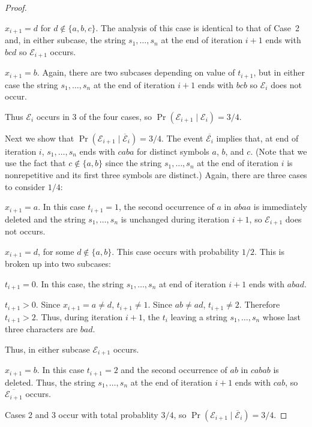 \documentclass{patmorin}
\begin{document}
\begin{proof}
\begin{compactenum}
    \item $x_{i+1}=d$ for $d\not\in\{a,b,c\}$.  The analysis of this case is identical to that of Case~2 and, in either subcase, the string $s_1,\ldots,s_n$ at the end of iteration $i+1$ ends with $bcd$ so $\mathcal{E}_{i+1}$ occurs.
    
    \item $x_{i+1}=b$.  Again, there are two subcases depending on value of $t_{i+1}$, but in either case the string $s_1,\ldots,s_n$ at the end of iteration $i+1$ ends with $bcb$ so $\mathcal{E}_i$ does not occur.
  \end{compactenum}
  Thus $\mathcal{E}_i$ occurs in 3 of the four cases, so $\Pr(\mathcal{E}_{i+1}\mid \mathcal{E}_{i})=3/4$.
  
  Next we show that $\Pr(\mathcal{E}_{i+1}\mid \overline{\mathcal{E}}_{i})=3/4$.
  The event $\overline{\mathcal{E}_i}$ implies that, at end of iteration $i$, $s_1,\ldots,s_n$ ends with $caba$ for distinct symbols $a$, $b$, and $c$.  (Note that we use the fact that $c\not\in\{a,b\}$ since the string $s_1,\ldots,s_n$ at the end of iteration $i$ is nonrepetitive and its first three symbols are distinct.)  Again, there are three cases to consider $1/4$:
  \begin{compactenum}
    \item $x_{i+1}=a$.  In this case $t_{i+1}=1$, the second occurrence of $a$ in $abaa$ is immediately deleted and the string $s_1,\ldots,s_n$ is unchanged during iteration $i+1$, so $\mathcal{E}_{i+1}$ does not occurs.
    
    \item $x_{i+1}=d$, for some $d\not\in\{a,b\}$.  This case occurs with probability $1/2$.  This is broken up into two subcases:
    \begin{compactenum}
      \item $t_{i+1}=0$.  In this case, the string $s_1,\ldots,s_n$ at end of iteration $i+1$ ends with $abad$.
      \item $t_{i+1}>0$.  Since $x_{i+1}=a\neq d$, $t_{i+1}\neq 1$.  Since $ab\neq ad$, $t_{i+1}\neq 2$.  Therefore $t_{i+1}>2$.  Thus, during iteration $i+1$, the $t_{i}$ leaving a string $s_1,\ldots,s_n$ whose last three characters are $bad$.
    \end{compactenum}
    Thus, in either subcase $\mathcal{E}_{i+1}$ occurs.
    
    \item $x_{i+1}=b$.  In this case $t_{i+1}=2$ and the second occurrence of $ab$ in $cabab$ is deleted. Thus, the string $s_1,\ldots,s_n$ at the end of iteration $i+1$ ends with $cab$, so $\overline{\mathcal{E}_{i+1}}$ occurs.
  \end{compactenum}
  Cases 2 and 3 occur with total probablity $3/4$, so $\Pr(\mathcal{E}_{i+1}\mid \overline{\mathcal{E}}_{i})=3/4$.
\end{proof}
\end{document}
